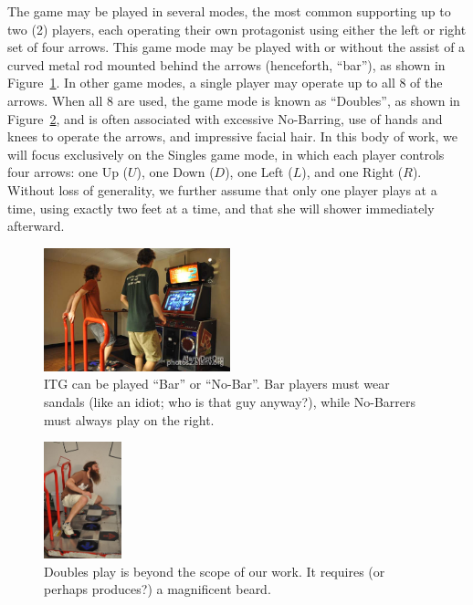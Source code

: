 \documentclass[10pt]{sigplanconf}
\begin{document}
The game may be played in several modes, the most common supporting up to two (2) players, each operating their own protagonist using either the left or right set of four arrows.
This game mode may be played with or without the assist of a curved metal rod mounted behind the arrows (henceforth, ``bar''), as shown in Figure~\ref{fig:bengreg}.
In other game modes, a single player may operate up to all 8 of the arrows. When all 8 are used, the game mode is known as ``Doubles'', as shown in Figure~\ref{fig:jim}, and is often associated with excessive No-Barring, use of hands and knees to operate the arrows, and impressive facial hair.
In this body of work, we will focus exclusively on the Singles game mode, in which each player controls four arrows: one Up ($U$), one Down ($D$), one Left ($L$), and one Right ($R$). Without loss of generality, we further assume that only one player plays at a time, using exactly two feet at a time, and that she will shower immediately afterward.

\begin{figure}[t]
	\begin{center}
	\includegraphics[width=0.48\textwidth]{bengreg.jpg}
	\end{center}
	\caption{ITG can be played ``Bar'' or ``No-Bar''. Bar players must wear sandals (like an idiot; who is that guy anyway?), while No-Barrers must always play on the right.}
	\label{fig:bengreg}
\end{figure}
\begin{figure}[t]
	\begin{center}
	\includegraphics[width=0.2\textwidth]{jim.jpg}
	\end{center}
	\caption{Doubles play is beyond the scope of our work. It requires (or perhaps produces?) a magnificent beard.}
	\label{fig:jim}
\end{figure}
\end{document}
